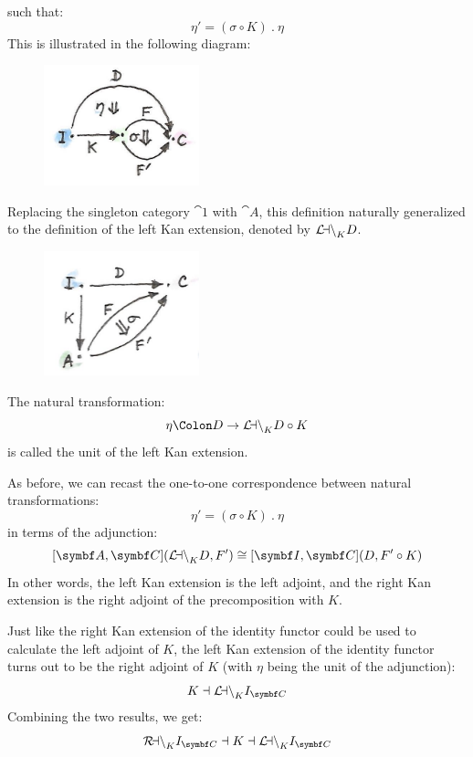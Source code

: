 \noindent
such that:
\[\eta' = (\sigma \circ K)\ .\ \eta\]
This is illustrated in the following diagram:

\begin{figure}[H]
\centering
\includegraphics[width=0.4\textwidth]{images/kan112.jpg}
\end{figure}

\noindent
Replacing the singleton category $\cat{1}$ with $\cat{A}$, this
definition naturally generalized to the definition of the left Kan
extension, denoted by $\mathcal{L\mkern-3mu an}_{K}D$.

\begin{figure}[H]
\centering
\includegraphics[width=0.4\textwidth]{images/kan12.jpg}
\end{figure}

\noindent
The natural transformation:
\[\eta \Colon D \to \Lan_{K}D \circ K\]
is called the unit of the left Kan extension.

As before, we can recast the one-to-one correspondence between natural
transformations:
\[\eta' = (\sigma \circ K)\ .\ \eta\]
in terms of the adjunction:
\[[\cat{A}, \cat{C}](\Lan_{K}D, F') \cong [\cat{I}, \cat{C}](D, F' \circ K)\]
In other words, the left Kan extension is the left adjoint, and the
right Kan extension is the right adjoint of the precomposition with
$K$.

Just like the right Kan extension of the identity functor could be used
to calculate the left adjoint of $K$, the left Kan extension of
the identity functor turns out to be the right adjoint of $K$
(with $\eta$ being the unit of the adjunction):
\[K \dashv \Lan_{K}I_{\cat{C}}\]
Combining the two results, we get:
\[\Ran_{K}I_{\cat{C}} \dashv K \dashv \Lan_{K}I_{\cat{C}}\]

